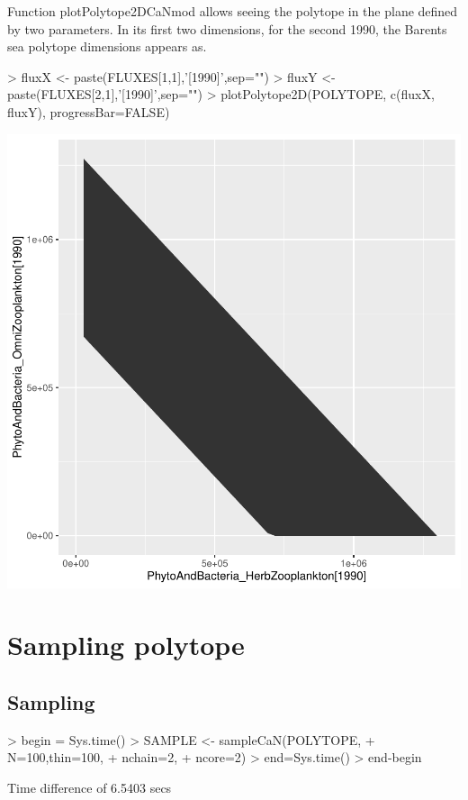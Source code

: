 \documentclass{article}
\begin{document}
Function plotPolytope2DCaNmod allows seeing the polytope in the plane defined by two parameters. In its first two dimensions, for the second 1990, the Barents sea polytope dimensions appears as. 

\begin{Schunk}
\begin{Sinput}
> fluxX <- paste(FLUXES[1,1],'[1990]',sep="")
> fluxY <- paste(FLUXES[2,1],'[1990]',sep="")
> plotPolytope2D(POLYTOPE, c(fluxX, fluxY), progressBar=FALSE)
\end{Sinput}
\end{Schunk}
\includegraphics{barents_SM-011}

\clearpage

\section{Sampling polytope}

\subsection{Sampling}

\begin{Schunk}
\begin{Sinput}
> begin = Sys.time()
> SAMPLE <- sampleCaN(POLYTOPE, 
+                       N=100,thin=100, 
+                       nchain=2,
+                       ncore=2)
> end=Sys.time()
> end-begin
\end{Sinput}
\begin{Soutput}
Time difference of 6.5403 secs
\end{Soutput}
\end{Schunk}
\end{document}
